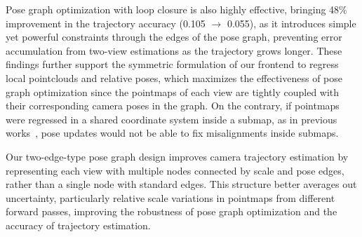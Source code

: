 Pose graph optimization with loop closure is also highly effective, bringing 48\% improvement in the trajectory accuracy (0.105 $\rightarrow$ 0.055),  as it introduces simple yet powerful constraints through the edges of the pose graph, preventing error accumulation from two-view estimations as the trajectory grows longer. These findings further support the symmetric formulation of our frontend to regress local pointclouds and relative poses, which maximizes the effectiveness of pose graph optimization since the pointmaps of each view  are tightly coupled with their corresponding camera poses in the graph. On the contrary, if pointmaps were regressed in a shared coordinate system inside a submap, as in previous works~\cite{dust3r,mast3r,wang2025spann3r,cabon2025must3r,liu2025slam3r,wang2025cut3r}, pose updates would not be able to fix misalignments inside submaps.

Our two-edge-type pose graph design improves camera trajectory estimation by representing each view with multiple nodes connected by scale and pose edges, rather than a single node with standard edges. This structure better averages out uncertainty, particularly relative scale variations in pointmaps from different forward passes, improving the robustness of pose graph optimization and the accuracy of trajectory estimation.
